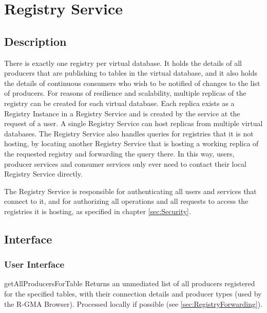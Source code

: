 \section{Registry Service}\label{sec:Registry}
\subsection{Description}

There is exactly one registry per virtual database. It holds the
details of all producers that are publishing to tables in the virtual
database, and it also holds the details of continuous consumers who wish to be
notified of changes to the list of producers. For reasons of resilience and
scalability, multiple replicas of the registry can be created for each virtual
database. Each replica exists as a Registry Instance in a Registry Service and
is created by the service at the request of a user. A single Registry
Service can host replicas from multiple virtual databases. The Registry Service
also handles queries for registries that it is not hosting, by locating
another Registry Service that is hosting a working replica of the requested
registry and forwarding the query there. In this way, users, producer services
and consumer services only ever need to contact their local Registry Service
directly.

The Registry Service is responsible for authenticating all users and services
that connect to it, and for authorizing all operations and all requests to
access the registries it is hosting, as specified in chapter \ref{sec:Security}.

\subsection{Interface}

\subsubsection{User Interface}

\begin{method}{getAllProducersForTable}
\desc Returns an unmediated list of all producers registered for the specified
tables, with their connection details and producer types (used by the R-GMA
Browser). Processed locally if possible (see \ref {sec:RegistryForwarding}).\\
\end{method}

